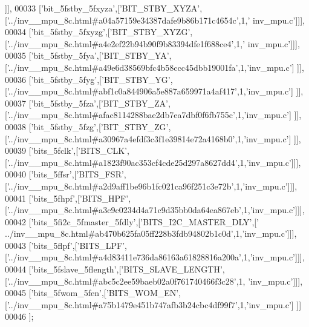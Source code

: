\begin{DoxyCode}
      ]],
00033   [\textcolor{stringliteral}{'bit\_5fstby\_5fxyza'},[\textcolor{stringliteral}{'BIT\_STBY\_XYZA'},[\textcolor{stringliteral}{'../inv\_\_mpu\_8c.html#a04a57159e34387dafe9b86b171c4654c'},1,\textcolor{stringliteral}{'
      inv\_mpu.c'}]]],
00034   [\textcolor{stringliteral}{'bit\_5fstby\_5fxyzg'},[\textcolor{stringliteral}{'BIT\_STBY\_XYZG'},[\textcolor{stringliteral}{'../inv\_\_mpu\_8c.html#a4e2ef22b94b90f9b83394dfe1f688ce4'},1,\textcolor{stringliteral}{'
      inv\_mpu.c'}]]],
00035   [\textcolor{stringliteral}{'bit\_5fstby\_5fya'},[\textcolor{stringliteral}{'BIT\_STBY\_YA'},[\textcolor{stringliteral}{'../inv\_\_mpu\_8c.html#a49e6d38569bfc4b58ccc45dbb19001fa'},1,\textcolor{stringliteral}{'inv\_mpu.c'}]
      ]],
00036   [\textcolor{stringliteral}{'bit\_5fstby\_5fyg'},[\textcolor{stringliteral}{'BIT\_STBY\_YG'},[\textcolor{stringliteral}{'../inv\_\_mpu\_8c.html#abf1c0a844906a5e887a659971a4af417'},1,\textcolor{stringliteral}{'inv\_mpu.c'}]
      ]],
00037   [\textcolor{stringliteral}{'bit\_5fstby\_5fza'},[\textcolor{stringliteral}{'BIT\_STBY\_ZA'},[\textcolor{stringliteral}{'../inv\_\_mpu\_8c.html#afac8114288bae2db7ea7dbf0f6fb755c'},1,\textcolor{stringliteral}{'inv\_mpu.c'}]
      ]],
00038   [\textcolor{stringliteral}{'bit\_5fstby\_5fzg'},[\textcolor{stringliteral}{'BIT\_STBY\_ZG'},[\textcolor{stringliteral}{'../inv\_\_mpu\_8c.html#a30967a4efdf3c3f1e39814e72a4168b0'},1,\textcolor{stringliteral}{'inv\_mpu.c'}]
      ]],
00039   [\textcolor{stringliteral}{'bits\_5fclk'},[\textcolor{stringliteral}{'BITS\_CLK'},[\textcolor{stringliteral}{'../inv\_\_mpu\_8c.html#a1823f90ac353cf4cde25d297a8627dd4'},1,\textcolor{stringliteral}{'inv\_mpu.c'}]]],
00040   [\textcolor{stringliteral}{'bits\_5ffsr'},[\textcolor{stringliteral}{'BITS\_FSR'},[\textcolor{stringliteral}{'../inv\_\_mpu\_8c.html#a2d9aff1be96b1fc021ca96f251c3e72b'},1,\textcolor{stringliteral}{'inv\_mpu.c'}]]],
00041   [\textcolor{stringliteral}{'bits\_5fhpf'},[\textcolor{stringliteral}{'BITS\_HPF'},[\textcolor{stringliteral}{'../inv\_\_mpu\_8c.html#a3c9c0234d4a71c9d35bb0da64ea867eb'},1,\textcolor{stringliteral}{'inv\_mpu.c'}]]],
00042   [\textcolor{stringliteral}{'bits\_5fi2c\_5fmaster\_5fdly'},[\textcolor{stringliteral}{'BITS\_I2C\_MASTER\_DLY'},[\textcolor{stringliteral}{'
      ../inv\_\_mpu\_8c.html#ab470b625fa05ff228b3fdb94802b1c0d'},1,\textcolor{stringliteral}{'inv\_mpu.c'}]]],
00043   [\textcolor{stringliteral}{'bits\_5flpf'},[\textcolor{stringliteral}{'BITS\_LPF'},[\textcolor{stringliteral}{'../inv\_\_mpu\_8c.html#a4d83411e736da86163a61828816a200a'},1,\textcolor{stringliteral}{'inv\_mpu.c'}]]],
00044   [\textcolor{stringliteral}{'bits\_5fslave\_5flength'},[\textcolor{stringliteral}{'BITS\_SLAVE\_LENGTH'},[\textcolor{stringliteral}{'../inv\_\_mpu\_8c.html#abc5c2ee59baeb02a0f761740466f3c28'},1,\textcolor{stringliteral}{
      'inv\_mpu.c'}]]],
00045   [\textcolor{stringliteral}{'bits\_5fwom\_5fen'},[\textcolor{stringliteral}{'BITS\_WOM\_EN'},[\textcolor{stringliteral}{'../inv\_\_mpu\_8c.html#a75b1479e451b747afb3b24cbc4df99f7'},1,\textcolor{stringliteral}{'inv\_mpu.c'}]
      ]]
00046 ];
\end{DoxyCode}
